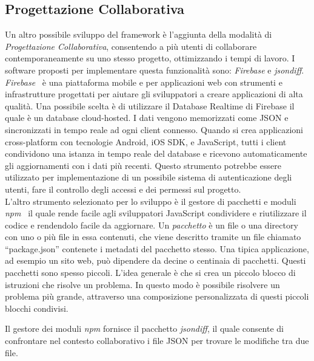 \subsection{Progettazione Collaborativa}
\label{sec:conclusions_section_2_sub_2}
Un altro possibile sviluppo del framework è l'aggiunta della modalità di \emph{Progettazione Collaborativa}, consentendo a più utenti
di collaborare contemporaneamente su uno stesso progetto, ottimizzando i tempi di lavoro.
I software proposti per implementare questa funzionalità sono:
\emph{Firebase} e \emph{jsondiff}.\\
\emph{Firebase}~\cite{firebase} è una piattaforma mobile e per applicazioni web con strumenti e infrastrutture progettati
per aiutare gli sviluppatori a creare applicazioni di alta qualità. Una possibile scelta è di utilizzare
il Database Realtime di Firebase  il quale è un database cloud-hosted. I dati vengono memorizzati come JSON e
sincronizzati in tempo reale ad ogni client connesso. Quando si crea applicazioni cross-platform con
tecnologie Android, iOS SDK, e JavaScript, tutti i client condividono una istanza in tempo reale del
database e ricevono automaticamente gli aggiornamenti con i dati più recenti.
Questo strumento potrebbe essere utilizzato per implementazione di un possibile sistema di autenticazione degli utenti,
fare il controllo degli accessi e dei permessi sul progetto.\\
L'altro strumento selezionato per lo sviluppo è il gestore di pacchetti e moduli \emph{npm}~\cite{npm} il quale rende facile agli sviluppatori
JavaScript condividere e riutilizzare il codice e rendendolo facile da aggiornare.
Un \emph{pacchetto} è un file o una directory con uno o più file in essa contenuti, che viene descritto tramite un file chiamato ``package.json''
contenete i metadati del pacchetto stesso. Una tipica applicazione, ad esempio un sito web, può dipendere da decine o centinaia di pacchetti.
Questi pacchetti sono spesso piccoli. L'idea generale è che si crea un piccolo blocco di istruzioni che risolve un problema.
In questo modo è possibile risolvere un problema più grande, attraverso una composizione personalizzata di questi piccoli
blocchi condivisi.
\newpage

Il gestore dei moduli \emph{npm} fornisce il pacchetto \emph{jsondiff}, il quale consente di confrontare nel contesto collaborativo
i file JSON per trovare le modifiche tra due file.\\

